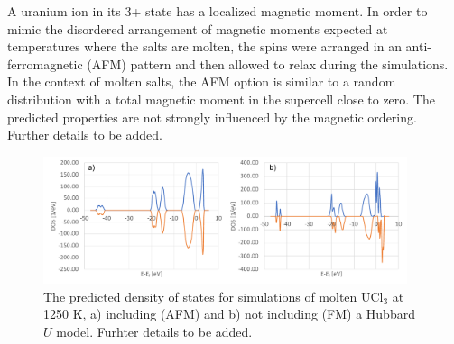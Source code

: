 \documentclass[preprint,3p,10pt,twocolumn,number,sort&compress]{elsarticle}
\begin{document}
A uranium ion in its 3+ state has a localized magnetic moment. In order to mimic the disordered arrangement of magnetic moments expected at temperatures where the salts are molten, the spins were arranged in an anti-ferromagnetic (AFM) pattern and then allowed to relax during the simulations. In the context of molten salts, the AFM option is similar to a random distribution with a total magnetic moment in the supercell close to zero. %
The predicted properties are not strongly influenced by the magnetic ordering. {\color{red} Further details to be added}. %

\begin{figure}[htb]
\centering
\includegraphics[width=0.95\textwidth]{FIG01.pdf}
\caption{The predicted density of states for simulations of molten UCl$_3$ at 1250 K, a) including (AFM) and b) not including (FM) a Hubbard $U$ model. {\color{red} Furhter details to be added.}} 
\label{fig:DOS}
\end{figure}
\end{document}
